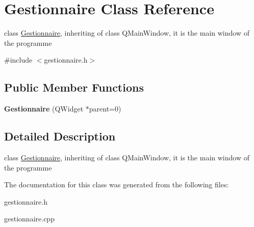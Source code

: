\hypertarget{classGestionnaire}{
\section{Gestionnaire Class Reference}
\label{classGestionnaire}
}


class \hyperlink{classGestionnaire}{Gestionnaire}, inheriting of class QMainWindow, it is the main window of the programme  




{\ttfamily \#include $<$gestionnaire.h$>$}

\subsection*{Public Member Functions}
\begin{DoxyCompactItemize}
\item 
\hypertarget{classGestionnaire_a1e7f34754221b7d6e1d59b1f23797419}{
{\bfseries Gestionnaire} (QWidget $\ast$parent=0)}
\label{classGestionnaire_a1e7f34754221b7d6e1d59b1f23797419}

\end{DoxyCompactItemize}


\subsection{Detailed Description}
class \hyperlink{classGestionnaire}{Gestionnaire}, inheriting of class QMainWindow, it is the main window of the programme 

The documentation for this class was generated from the following files:\begin{DoxyCompactItemize}
\item 
gestionnaire.h\item 
gestionnaire.cpp\end{DoxyCompactItemize}
